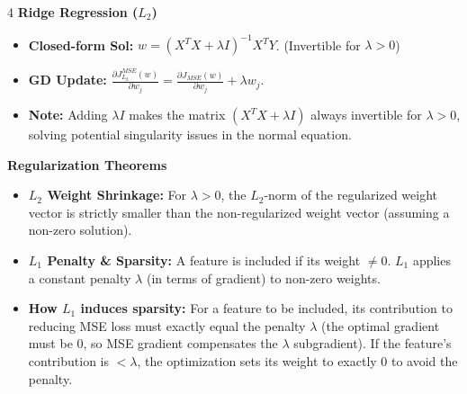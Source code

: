 \documentclass[8pt,landscape,a4paper]{extarticle}
\begin{document}
\begin{multicols*}{4}
\noindent\textbf{Ridge Regression ($L_2$)}
\begin{itemize}[leftmargin=*, nosep]
    \item \textbf{Closed-form Sol:} $w = (X^T X + \lambda I)^{-1} X^T Y$. (Invertible for $\lambda > 0$)
    \item \textbf{GD Update:} $\frac{\partial J_{L_2}^{MSE}(w)}{\partial w_j} = \frac{\partial J_{MSE}(w)}{\partial w_j} + \lambda w_j$.
    \item \textbf{Note:} Adding $\lambda I$ makes the matrix $(X^T X + \lambda I)$ always invertible for $\lambda > 0$, solving potential singularity issues in the normal equation.
\end{itemize}

\vspace{1mm}
\noindent\textbf{Regularization Theorems}
\begin{itemize}[leftmargin=*, nosep]
    \item \textbf{$L_2$ Weight Shrinkage:} For $\lambda > 0$, the $L_2$-norm of the regularized weight vector is strictly smaller than the non-regularized weight vector (assuming a non-zero solution).
    \item \textbf{$L_1$ Penalty \& Sparsity:} A feature is included if its weight $\neq 0$. $L_1$ applies a constant penalty $\lambda$ (in terms of gradient) to non-zero weights. 
    \item \textbf{How $L_1$ induces sparsity:} For a feature to be included, its contribution to reducing MSE loss must exactly equal the penalty $\lambda$ (the optimal gradient must be 0, so MSE gradient compensates the $\lambda$ subgradient). If the feature's contribution is $< \lambda$, the optimization sets its weight to exactly 0 to avoid the penalty.
\end{itemize}


\end{multicols*}
\end{document}
